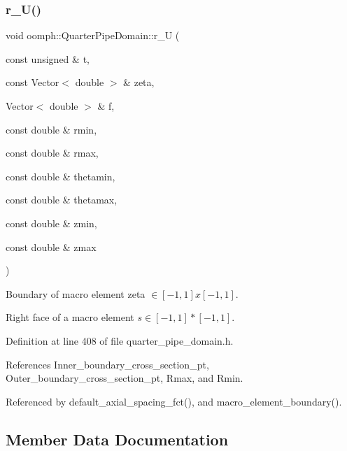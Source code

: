\subsubsection{\texorpdfstring{r\+\_\+\+U()}{r\_U()}}
{\footnotesize\ttfamily void oomph\+::\+Quarter\+Pipe\+Domain\+::r\+\_\+U (\begin{DoxyParamCaption}\item[{const unsigned \&}]{t,  }\item[{const Vector$<$ double $>$ \&}]{zeta,  }\item[{Vector$<$ double $>$ \&}]{f,  }\item[{const double \&}]{rmin,  }\item[{const double \&}]{rmax,  }\item[{const double \&}]{thetamin,  }\item[{const double \&}]{thetamax,  }\item[{const double \&}]{zmin,  }\item[{const double \&}]{zmax }\end{DoxyParamCaption})\hspace{0.3cm}{\ttfamily [private]}}



Boundary of macro element zeta $ \in [-1,1]x[-1,1] $. 

Right face of a macro element $ s \in [-1,1]*[-1,1] $. 

Definition at line 408 of file quarter\+\_\+pipe\+\_\+domain.\+h.



References Inner\+\_\+boundary\+\_\+cross\+\_\+section\+\_\+pt, Outer\+\_\+boundary\+\_\+cross\+\_\+section\+\_\+pt, Rmax, and Rmin.



Referenced by default\+\_\+axial\+\_\+spacing\+\_\+fct(), and macro\+\_\+element\+\_\+boundary().



\subsection{Member Data Documentation}
\mbox{\label{classoomph_1_1QuarterPipeDomain_ada15e8a576d3715e8ed88ea9bef5508a}} 
